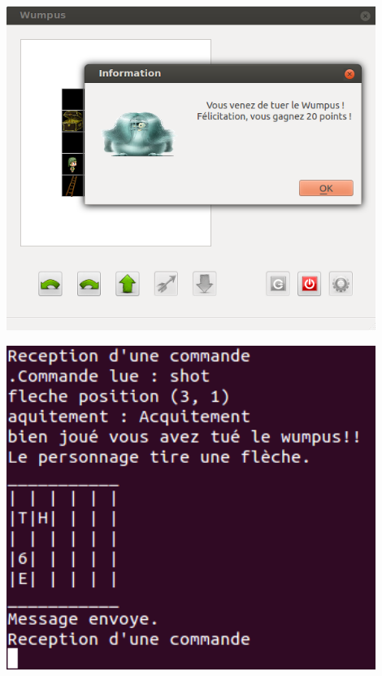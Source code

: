 \documentclass[a4paper,10pt]{article}
\begin{document}

		\begin{minipage}[t]{0.46\textwidth}
			\vspace{2pt}
			\centering
			\includegraphics[width=0.9\textwidth]{JeuxDEssais/Wumpus6.png}
		\end{minipage}
		\hfill
		\begin{minipage}[t]{0.46\textwidth}
			\vspace{2pt}
			\centering
			\includegraphics[width=0.9\textwidth]{JeuxDEssais/Serveur6.png}
		\end{minipage}
\end{document}

